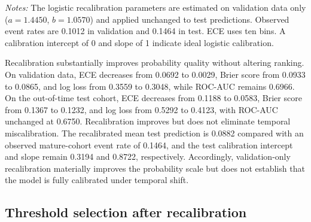 \documentclass[10pt]{article}
\begin{document}
\begin{table}[!ht]
\centering
\caption{Calibration diagnostics before and after validation-only logistic recalibration of the selected HistGB estimator.}
\label{tab:recalibration}

\vspace{3pt}
{\footnotesize \textit{Notes:} The logistic recalibration parameters are estimated on validation data only ($a=1.4450$, $b=1.0570$) and applied unchanged to test predictions. Observed event rates are 0.1012 in validation and 0.1464 in test. ECE uses ten bins. A calibration intercept of 0 and slope of 1 indicate ideal logistic calibration.}
\end{table}

Recalibration substantially improves probability quality without altering ranking. On validation data, ECE decreases from 0.0692 to 0.0029, Brier score from 0.0933 to 0.0865, and log loss from 0.3559 to 0.3048, while ROC-AUC remains 0.6966. On the out-of-time test cohort, ECE decreases from 0.1188 to 0.0583, Brier score from 0.1367 to 0.1232, and log loss from 0.5292 to 0.4123, with ROC-AUC unchanged at 0.6750. Recalibration improves but does not eliminate temporal miscalibration. The recalibrated mean test prediction is 0.0882 compared with an observed mature-cohort event rate of 0.1464, and the test calibration intercept and slope remain 0.3194 and 0.8722, respectively. Accordingly, validation-only recalibration materially improves the probability scale but does not establish that the model is fully calibrated under temporal shift.

\subsection{Threshold selection after recalibration}
\label{sec:thresholds}
\end{document}
